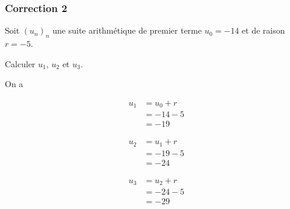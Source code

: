 \documentclass[15pt, mathserif]{beamer}
\begin{document}
\begin{frame}
\vspace{-10mm}
	\frametitle{Correction 2}
Soit $(u_n)_n$ une suite arithmétique de premier terme $u_0=-14$ et de raison $r=-5$. 
 
 Calculer $u_1$, $u_2$ et $u_3$. 
 
 On a 
 \begin{minipage}{0.25\textwidth} 
 
 \begin{align*} 
 u_1 &= u_0+r \\ &= -14-5 \\ &=-19
 \end{align*} 
  
 \end{minipage} \hfil \begin{minipage}{0.25\textwidth} 
 
 \begin{align*} 
 u_2 &= u_1+r \\ &= -19-5 \\ &=-24
 \end{align*} 
 
 \end{minipage} \hfil \begin{minipage}{0.25\textwidth} 
 
 \begin{align*} 
 u_3 &= u_2+r \\ &= -24-5 \\ &=-29
 \end{align*} 
 
 \end{minipage} 
\end{frame}
\end{document}
